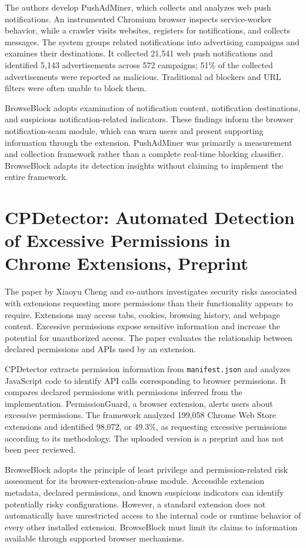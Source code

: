 The authors develop PushAdMiner, which collects and analyzes web push
notifications. An instrumented Chromium browser inspects service-worker behavior,
while a crawler visits websites, registers for notifications, and collects
messages. The system groups related notifications into advertising campaigns and
examines their destinations. It collected 21,541 web push notifications and
identified 5,143 advertisements across 572 campaigns; 51\% of the collected
advertisements were reported as malicious. Traditional ad blockers and URL
filters were often unable to block them.

BrowseBlock adopts examination of notification content, notification destinations,
and suspicious notification-related indicators. These findings inform the browser
notification-scam module, which can warn users and present supporting information
through the extension. PushAdMiner was primarily a measurement and collection
framework rather than a complete real-time blocking classifier. BrowseBlock adapts
its detection insights without claiming to implement the entire framework.

\clearpage
\section{CPDetector: Automated Detection of Excessive Permissions in Chrome Extensions, Preprint}
The paper by Xiaoyu Cheng and co-authors investigates security risks associated
with extensions requesting more permissions than their functionality appears to
require. Extensions may access tabs, cookies, browsing history, and webpage
content. Excessive permissions expose sensitive information and increase the
potential for unauthorized access. The paper evaluates the relationship between
declared permissions and APIs used by an extension.

CPDetector extracts permission information from \texttt{manifest.json} and
analyzes JavaScript code to identify API calls corresponding to browser
permissions. It compares declared permissions with permissions inferred from the
implementation. PermissionGuard, a browser extension, alerts users about excessive
permissions. The framework analyzed 199,058 Chrome Web Store extensions and
identified 98,072, or 49.3\%, as requesting excessive permissions according to
its methodology. The uploaded version is a preprint and has not been peer
reviewed.

BrowseBlock adopts the principle of least privilege and permission-related risk
assessment for its browser-extension-abuse module. Accessible extension metadata,
declared permissions, and known suspicious indicators can identify potentially
risky configurations. However, a standard extension does not automatically have
unrestricted access to the internal code or runtime behavior of every other
installed extension. BrowseBlock must limit its claims to information available
through supported browser mechanisms.

